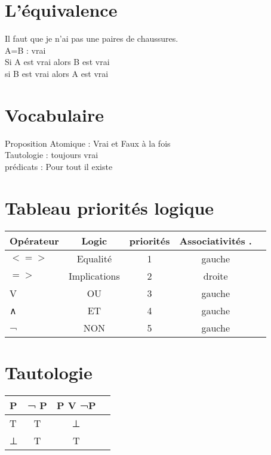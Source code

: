 \section{L'équivalence}
\vspace{5mm} %

Il faut que je n'ai pas une paires de chaussures. \\
A=B : vrai \\
Si A est vrai alors B est vrai \\
si B est vrai alors A est vrai \\

\section{Vocabulaire}
\vspace{5mm} %

Proposition Atomique : Vrai et Faux à la fois \\
Tautologie : toujours vrai \\
prédicats :  Pour tout il existe \\



\section{Tableau priorités logique}
\begin{tabular}{|l|c|c|c|c|}
  \hline
  Opérateur & Logic & priorités & Associativités .\\
  \hline
  $<=>$ & Equalité & 1 & gauche \\
  $=>$ & Implications & 2 & droite \\
  V & OU & 3 & gauche \\
  ∧ & ET & 4 & gauche \\
  ¬ & NON & 5 & gauche \\
  \hline
\end{tabular}


\section{Tautologie}
\begin{tabular}{|l|c|c|c|}
  \hline
  P & ¬ P & P V ¬P \\
  \hline
  T & T & ⊥ \\
  ⊥ & T & T \\
  \hline
\end{tabular}

